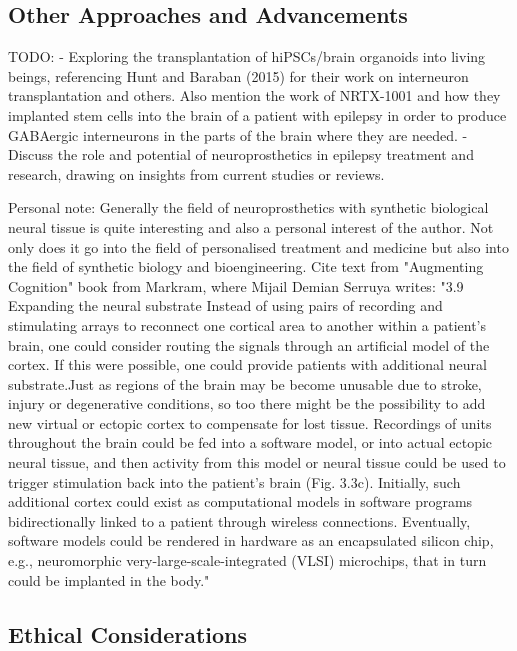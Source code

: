 \documentclass[10pt]{article}
\begin{document}
\begin{sloppypar}
  \subsection{Other Approaches and Advancements}
  \label{sec:other-approaches-and-advancements}

  TODO:
  - Exploring the transplantation of hiPSCs/brain organoids into living beings, referencing Hunt and Baraban (2015) for their work on interneuron transplantation and others. Also mention the work of NRTX-1001 and how they implanted stem cells into the brain of a patient with epilepsy in order to produce GABAergic interneurons in the parts of the brain where they are needed.
  - Discuss the role and potential of neuroprosthetics in epilepsy treatment and research, drawing on insights from current studies or reviews.

  Personal note: Generally the field of neuroprosthetics with synthetic biological neural tissue is quite interesting and also a personal interest of the author. Not only does it go into the field of personalised treatment and medicine but also into the field of synthetic biology and bioengineering. Cite text from "Augmenting Cognition" book from Markram, where Mijail Demian Serruya writes: "3.9 Expanding the neural substrate  Instead of using pairs of recording and stimulating arrays to reconnect one cortical area to another within a patient’s brain, one could  consider routing the signals through an artificial model of the cortex.  If this were possible, one could provide patients with additional neural substrate.Just as regions of the brain may be become unusable due  to stroke, injury or degenerative conditions, so too there might be the  possibility to add new virtual or ectopic cortex to compensate for lost  tissue. Recordings of units throughout the brain could be fed into a  software model, or into actual ectopic neural tissue, and then activity from this model or neural tissue could be used to trigger stimulation back into the patient’s brain (Fig. 3.3c). Initially, such additional cortex could exist as computational models in software programs  bidirectionally linked to a patient through wireless connections. Eventually, software models could be rendered in hardware as an encapsulated silicon chip, e.g., neuromorphic very-large-scale-integrated  (VLSI) microchips, that in turn could be implanted in the body."

  \subsection{Ethical Considerations}
  \label{sec:ethical-considerations}


\end{sloppypar}
\end{document}
